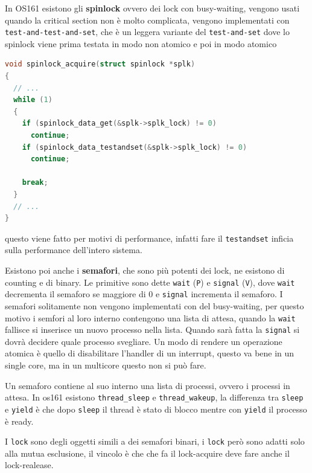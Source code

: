 \documentclass[12pt]{article}
\begin{document}
In OS161 esistono gli \textbf{spinlock} ovvero dei lock con busy-waiting, vengono usati quando la critical section non \`e molto complicata, vengono implementati con \texttt{test-and-test-and-set}, che \`e un leggera variante del \texttt{test-and-set} dove lo spinlock viene prima testata in modo non atomico e poi in modo atomico
\begin{lstlisting}[language=c]
void spinlock_acquire(struct spinlock *splk)
{
  // ...
  while (1)
  {
    if (spinlock_data_get(&splk->splk_lock) != 0)
      continue;
    if (spinlock_data_testandset(&splk->splk_lock) != 0)
      continue;

    break;
  }
  // ...
}
\end{lstlisting}
questo viene fatto per motivi di performance, infatti fare il \texttt{testandset} inficia sulla performance dell'intero sistema.

Esistono poi anche i \textbf{semafori}, che sono pi\`u potenti dei lock, ne esistono di counting e di binary. Le primitive sono dette \texttt{wait} (\texttt{P}) e \texttt{signal} (\texttt{V}), dove \texttt{wait} decrementa il semaforo se maggiore di 0 e \texttt{signal} incrementa il semaforo. I semafori solitamente non vengono implementati con del busy-waiting, per questo motivo i semfori al loro interno contengono una lista di attesa, quando la \texttt{wait} fallisce si inserisce un nuovo processo nella lista. Quando sar\`a fatta la \texttt{signal} si dovr\`a decidere quale processo svegliare. Un modo di rendere un operazione atomica \`e quello di disabilitare l'handler di un interrupt, questo va bene in un single core, ma in un multicore questo non si pu\`o fare.


Un semaforo contiene al suo interno una lista di processi, ovvero i processi in attesa. In os161 esistono \texttt{thread\_sleep} e \texttt{thread\_wakeup}, la differenza tra \texttt{sleep} e \texttt{yield} \`e che dopo \texttt{sleep} il thread \`e stato di blocco mentre con \texttt{yield} il processo \`e ready.

I \texttt{lock} sono degli oggetti simili a dei semafori binari, i \texttt{lock} per\`o sono adatti solo alla mutua esclusione, il vincolo \`e che che fa il lock-acquire deve fare anche il lock-realease.
\end{document}

